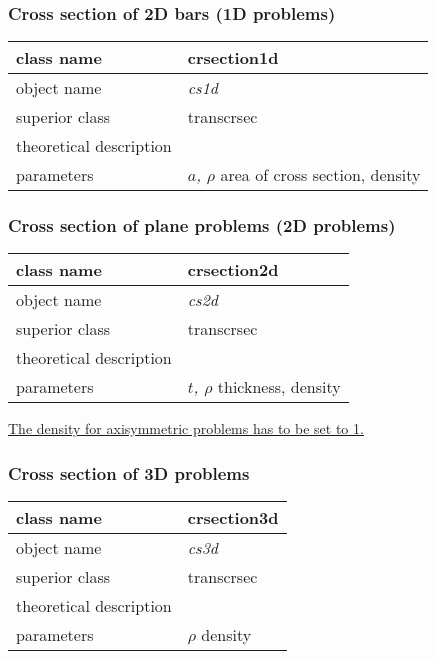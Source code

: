 \subsubsection{Cross section of 2D bars (1D problems)}

\begin{center}
\begin{tabular}{|l|l|}
\hline
class name & {\sf crsection1d}\index{class!{\sf crsection1d}}
\\ \hline
object name & {\it cs1d}\index{instance!{\it cs1d}}
\\ \hline
superior class & {\sf transcrsec}
\\ \hline
theoretical description &
\\ \hline
parameters & {\it $a$, $\rho$ } area of cross section, density
\\ \hline
\end{tabular}
\end{center}


\subsubsection{Cross section of plane problems (2D problems)}

\begin{center}
\begin{tabular}{|l|l|}
\hline
class name & {\sf crsection2d}\index{class!{\sf crsection2d}}
\\ \hline
object name & {\it cs2d}\index{instance!{\it cs2d}}
\\ \hline
superior class & {\sf transcrsec}
\\ \hline
theoretical description &
\\ \hline
parameters & {\it $t$, $\rho$ } thickness, density
\\ \hline
\end{tabular}
\end{center}

\underline{The density for axisymmetric problems has to be set to 1.}

\subsubsection{Cross section of 3D problems}

\begin{center}
\begin{tabular}{|l|l|}
\hline
class name & {\sf crsection3d}\index{class!{\sf crsection3d}}
\\ \hline
object name & {\it cs3d}\index{instance!{\it cs3d}}
\\ \hline
superior class & {\sf transcrsec}
\\ \hline
theoretical description &
\\ \hline
parameters & {\it $\rho$ } density
\\ \hline
\end{tabular}
\end{center} 

